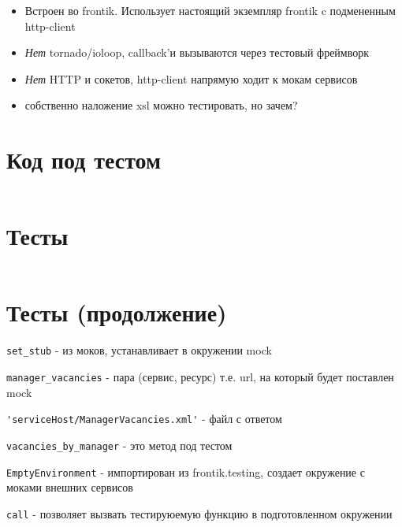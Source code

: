 \documentclass[12pt]{article}
\begin{document}
\begin{itemize}
\item Встроен во frontik. Использует настоящий экземпляр frontik c подмененным http-client
\item \emph{Нет} tornado/ioloop, callback'и вызываются через тестовый фреймворк
\item \emph{Нет} HTTP и сокетов, http-client напрямую ходит к мокам сервисов
\item собственно наложение xsl можно тестировать, но зачем?

\end{itemize}



\section{Код под тестом}
\small
\inputminted[linenos=true]{python}{code.py}

\section{Тесты}

\small
\inputminted[linenos=true]{python}{test.py}

\section{Тесты (продолжение)}
\verb+set_stub+ - из моков, устанавливает в окружении mock

\verb+manager_vacancies+ - пара (сервис, ресурс) т.е. url, на который будет поставлен mock

\verb+'serviceHost/ManagerVacancies.xml'+ - файл с ответом

\verb+vacancies_by_manager+ - это метод под тестом

\verb+EmptyEnvironment+ - импортирован из frontik.testing, создает окружение с моками внешних сервисов

\verb+call+ - позволяет вызвать тестируюемую функцию в подготовленном окружении
\end{document}
